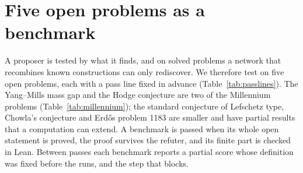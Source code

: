 \section{Five open problems as a benchmark}\label{sec:benchmark}

A proposer is tested by what it finds, and on solved problems a network that recombines known constructions can only rediscover. We therefore test on five open problems, each with a pass line fixed in advance (Table~\ref{tab:passlines}). The Yang--Mills mass gap and the Hodge conjecture are two of the Millennium problems (Table~\ref{tab:millennium}); the standard conjecture of Lefschetz type, Chowla's conjecture and Erd\H{o}s problem 1183 are smaller and have partial results that a computation can extend. A benchmark is passed when its whole open statement is proved, the proof survives the refuter, and its finite part is checked in Lean. Between passes each benchmark reports a partial score whose definition was fixed before the runs, and the step that blocks.

